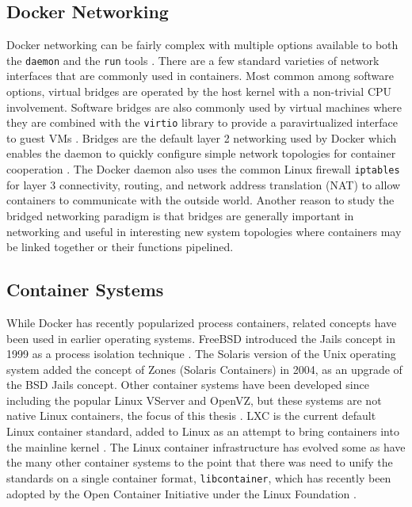 \subsection{Docker Networking} %
\label{sub:dockernetworking}
Docker networking can be fairly complex with multiple options available to both the \texttt{daemon} and the \texttt{run} tools \autocite{dockernetworking1}.
There are a few standard varieties of network interfaces that are commonly used in containers.
Most common among software options, virtual bridges are operated by the host kernel with a non-trivial CPU involvement. 
Software bridges are also commonly used by virtual machines where they are combined with the \texttt{virtio} library to provide a paravirtualized interface to guest VMs \autocite{_virtio_1}. 
Bridges are the default layer 2 networking used by Docker which enables the daemon to quickly configure simple network topologies for container cooperation \autocite{dockernetworking1}.  
The Docker daemon also uses the common Linux firewall \texttt{iptables} for layer 3 connectivity, routing, and network address translation (NAT) to allow containers to communicate with the outside world.
Another reason to study the bridged networking paradigm is that bridges are generally important in networking and useful in interesting new system topologies where containers may be linked together or their functions pipelined.

\subsection{Container Systems} %
\label{sec:container_systems}
While Docker has recently popularized process containers, related concepts have been used in earlier operating systems.
FreeBSD introduced the Jails concept in 1999 as a process isolation technique \autocite{_zones_1}.  
The Solaris version of the Unix operating system added the concept of Zones (Solaris Containers) in 2004, as an upgrade of the BSD Jails concept.  
Other container systems have been developed since including the popular Linux VServer and OpenVZ, but these systems are not native Linux containers, the focus of this thesis \autocite{rathore2013kvm, _scheepers_1, des2005virtualization}.  
LXC is the current default Linux container standard, added to Linux as an attempt to bring containers into the mainline kernel \autocite{dockersecurity1}.
The Linux container infrastructure has evolved some as have the many other container systems to the point that there was need to unify the standards on a single container format, \texttt{libcontainer}, which has recently been adopted by the Open Container Initiative under the Linux Foundation \autocite{_oci_1}.  

